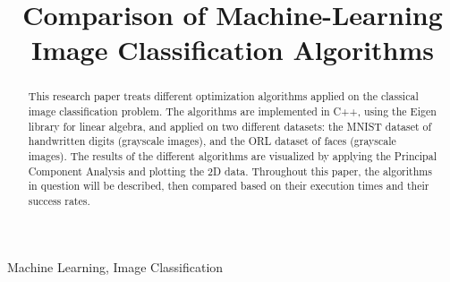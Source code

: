 \documentclass[conference]{IEEEtran}
\begin{document}
\title{Comparison of Machine-Learning Image Classification Algorithms}

\author{
}

\maketitle

\begin{abstract}
  This research paper treats different optimization algorithms applied on the classical image classification problem. The algorithms are implemented in C++, using the Eigen library for linear algebra, and applied on two different datasets: the MNIST dataset of handwritten digits (grayscale images), and the ORL dataset of faces (grayscale images). The results of the different algorithms are visualized by applying the Principal Component Analysis and plotting the 2D data. Throughout this paper, the algorithms in question will be described, then compared based on their execution times and their success rates.

\end{abstract}

\begin{IEEEkeywords}
Machine Learning, Image Classification
\end{IEEEkeywords}



%

%

\end{document}
